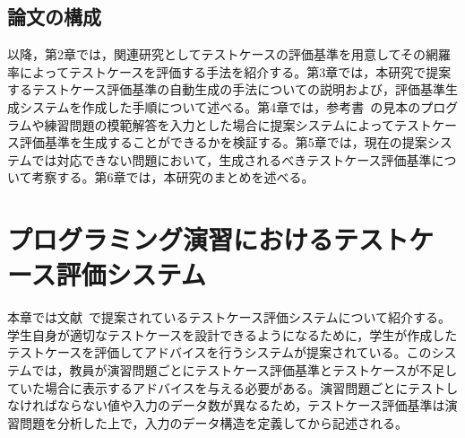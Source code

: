 \documentclass{tpu-sotu}
\begin{document}
\section{論文の構成}
以降，第2章では，関連研究としてテストケースの評価基準を用意してその網羅率によってテストケースを評価する手法を紹介する。第3章では，本研究で提案するテストケース評価基準の自動生成の手法についての説明および，評価基準生成システムを作成した手順について述べる。第4章では，参考書~\cite{b1}の見本のプログラムや練習問題の模範解答を入力とした場合に提案システムによってテストケース評価基準を生成することができるかを検証する。第5章では，現在の提案システムでは対応できない問題において，生成されるべきテストケース評価基準について考察する。第6章では，本研究のまとめを述べる。
\chapter{プログラミング演習におけるテストケース評価システム}
本章では文献~\cite{a1}で提案されているテストケース評価システムについて紹介する。学生自身が適切なテストケースを設計できるようになるために，学生が作成したテストケースを評価してアドバイスを行うシステムが提案されている。このシステムでは，教員が演習問題ごとにテストケース評価基準とテストケースが不足していた場合に表示するアドバイスを与える必要がある。演習問題ごとにテストしなければならない値や入力のデータ数が異なるため，テストケース評価基準は演習問題を分析した上で，入力のデータ構造を定義してから記述される。
\end{document}
